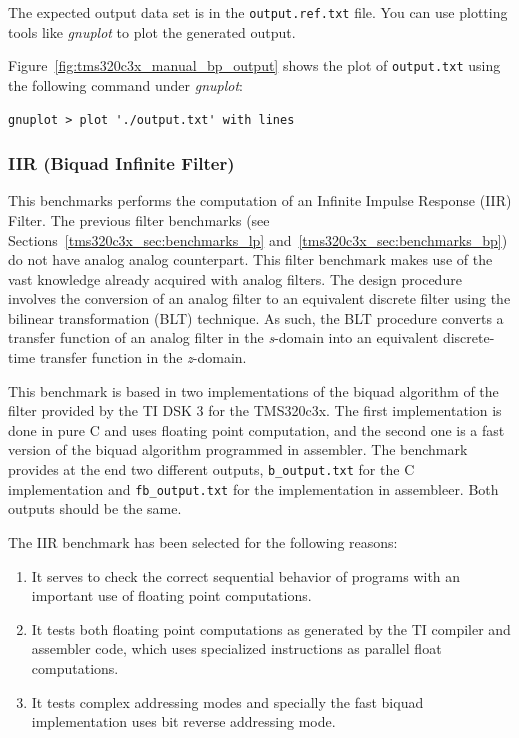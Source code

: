 The expected output data set is in the \texttt{output.ref.txt} file.
You can use plotting tools like \textit{gnuplot} to plot the generated output. 

Figure~\ref{fig:tms320c3x_manual_bp_output} shows the plot of \texttt{output.txt} using the following command under \textit{gnuplot}:

\begin{verbatim}
gnuplot > plot './output.txt' with lines
\end{verbatim}

\subsubsection{IIR (Biquad Infinite Filter)}

This benchmarks performs the computation of an Infinite Impulse Response (IIR) Filter.
The previous filter benchmarks (see Sections~\ref{tms320c3x_sec:benchmarks_lp} and~\ref{tms320c3x_sec:benchmarks_bp}) do not have analog analog counterpart.
This filter benchmark makes use of the vast knowledge already acquired with analog filters.
The design procedure involves the conversion of an analog filter to an equivalent discrete filter using the bilinear transformation (BLT) technique.
As such, the BLT procedure converts a transfer function of an analog filter in the \textit{s}-domain into an equivalent discrete-time transfer function in the \textit{z}-domain.

This benchmark is based in two implementations of the biquad algorithm of the filter provided by the TI DSK 3 for the TMS320c3x.
The first implementation is done in pure C and uses floating point computation, and the second one is a fast version of the biquad algorithm programmed in assembler.
The benchmark provides at the end two different outputs, \texttt{b\_output.txt} for the C implementation and \texttt{fb\_output.txt} for the implementation in assembleer.
Both outputs should be the same.

The IIR benchmark has been selected for the following reasons:
\begin{enumerate}
	\item It serves to check the correct sequential behavior of programs with an important use of floating point computations.
	\item It tests both floating point computations as generated by the TI compiler and assembler code, which uses specialized instructions as parallel float computations.
	\item It tests complex addressing modes and specially the fast biquad implementation uses bit reverse addressing mode.
\end{enumerate}

